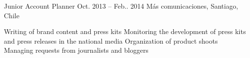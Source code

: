 \begin{joblist}
\item[Junior Account Planner]{Oct. 2013 -- Feb.. 2014 }     
  	{Más comunicaciones, Santiago, Chile}     
  	{
		\iftbftiny \setlength{\parskip}{-10pt} \fi
		\begin{itemize}
			  \iftbftiny \setlength\itemsep{-3pt} \fi
			  \cvitem[\checkmark] Writing of brand content and press kits
			  \cvitem[\checkmark] Monitoring the development of press kits and press releases in the national media
			  \cvitem[\checkmark] Organization of product shoots
			  \cvitem[\checkmark] Managing requests from journalists and bloggers
		\end{itemize}       
	}




  
       

   

\end{joblist}

%
%


